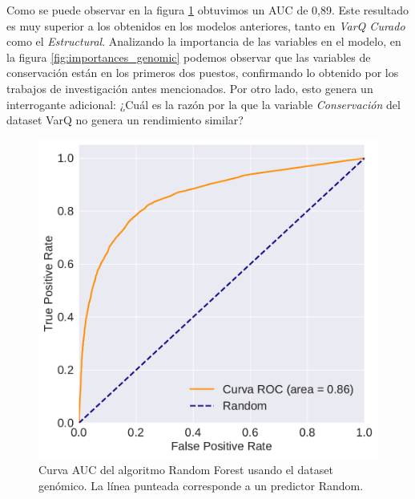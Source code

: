 Como se puede observar en la figura \ref{fig:auc_genomic} obtuvimos un AUC de 0,89. Este resultado es muy superior a los obtenidos en los modelos anteriores, tanto en \textit{VarQ Curado} como el \textit{Estructural}. 
Analizando la importancia de las variables en el modelo, en la figura \ref{fig:importances_genomic} podemos observar que las variables de conservación están en los primeros dos puestos, confirmando lo obtenido por los trabajos de investigación antes mencionados. Por otro lado, esto genera un interrogante adicional: ¿Cuál es la razón por la que la variable \textit{Conservación} del dataset VarQ no genera un rendimiento similar?


\begin{figure}[H]
    \centering
    \includegraphics[scale=0.55]{documents/latex/figures/3/auc_genomic.pdf}
    \caption{Curva AUC del algoritmo Random Forest usando el dataset genómico. La línea punteada corresponde a un predictor Random.}
    \label{fig:auc_genomic}
\end{figure}

